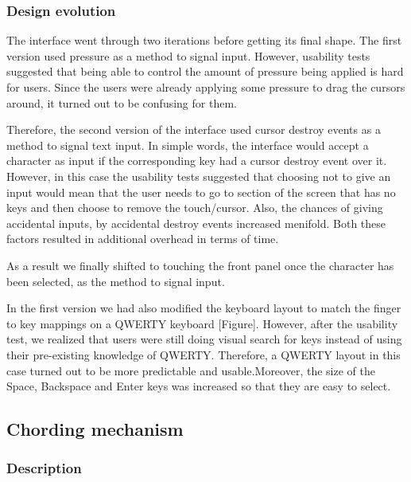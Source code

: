 \subsubsection{Design evolution}

The interface went through two iterations before getting its final
shape. The first version used pressure as a method to signal
input. However, usability tests suggested that being able to control
the amount of pressure being applied is hard for users. Since the
users were already applying some pressure to drag the cursors around,
it turned out to be confusing for them.

Therefore, the second version of the interface used cursor destroy
events as a method to signal text input. In simple words, the
interface would accept a character as input if the corresponding key
had a cursor destroy event over it. However, in this case the
usability tests suggested that choosing not to give an input would
mean that the user needs to go to section of the screen that has no
keys and then choose to remove the touch/cursor. Also, the chances of
giving accidental inputs, by accidental destroy events increased
menifold. Both these factors resulted in additional overhead in terms
of time.

As a result we finally shifted to touching the front panel once the
character has been selected, as the method to signal input.

In the first version we had also modified the keyboard layout to match
the finger to key mappings on a QWERTY keyboard [Figure]. However,
after the usability test, we realized that users were still doing
visual search for keys instead of using their pre-existing knowledge
of QWERTY. Therefore, a QWERTY layout in this case turned out to be
more predictable and usable.Moreover, the size of the Space, Backspace
and Enter keys was increased so that they are easy to select.

\subsection{Chording mechanism}
\subsubsection{Description}

